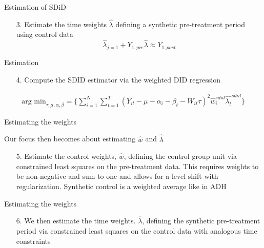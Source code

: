 \documentclass{beamer}
\begin{document}
\begin{frame}{Estimation of SDiD}

	\begin{enumerate}

	\item[3. ] Estimate the time weights $\widehat{\lambda}$ defining a synthetic pre-treatment period using control data$$\widehat{\lambda}_{j=1} + Y_{1,pre} \widehat{\lambda} \approx Y_{1,post}$$
	\end{enumerate}

\end{frame}


\begin{frame}{Estimation}

\begin{enumerate}
\item[4. ] Compute the SDID estimator via the weighted DID regression
\end{enumerate}

\begin{eqnarray*}
\textrm{arg min}_{\tau, \mu, \alpha, \beta} = \bigg \{ \sum_{i=1}^N \sum_{t=1}^T ( Y_{it} - \mu - \alpha_i -\beta_t - W_{it}\tau ) ^2 \widehat{w}_i^{sdid} \widehat{\lambda_t}^{sdid}  \bigg \}
\end{eqnarray*}


\end{frame}

\begin{frame}{Estimating the weights}

Our focus then becomes about estimating $\widehat{w}$ and $\widehat{\lambda}$

\begin{enumerate}
\item[5. ] Estimate the control weights, $\widehat{w}$, defining the control group unit via constrained least squares on the pre-treatment data. This requires weights to be non-negative and sum to one and allows for a level shift with regularization.  Synthetic control is a weighted average like in ADH
\end{enumerate}

\end{frame}


\begin{frame}{Estimating the weights}

\begin{enumerate}

\item[6. ] We then estimate the time weights. $\widehat{\lambda}$, defining the synthetic pre-treatment period via constrained least squares on the control data with analogous time constraints

\end{enumerate}

\end{frame}
\end{document}
